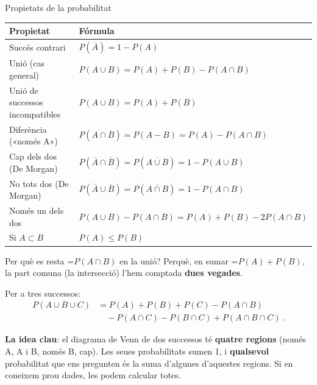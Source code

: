 \documentclass[11pt,a4paper]{article}
\newcommand{\fmm}[1]{\setbox0=\hbox{$#1$}\ifdim\wd0>\linewidth\[#1\]\else\mbox{\box0}\fi}
\newcommand{\fmuline}[1]{\textbf{\color{fmaccent}#1}}
\begin{document}
  
\begin{fmprop}{Propietats de la probabilitat}
\begin{center}\renewcommand{\arraystretch}{1.7}\small\begin{tabularx}{\linewidth}{>{\raggedright\arraybackslash}p{5.2cm}>{\centering\arraybackslash}X}\toprule
\textbf{Propietat} & \textbf{Fórmula}\\\midrule
Succés contrari & $P(\overline{A})=1-P(A)$\\[3pt]
Unió (cas general) & $P(A\cup B)=P(A)+P(B)-P(A\cap B)$\\[3pt]
Unió de successos incompatibles & $P(A\cup B)=P(A)+P(B)$\\[3pt]
Diferència («només A») & $P(A\cap\overline{B})=P(A-B)=P(A)-P(A\cap B)$\\[3pt]
Cap dels dos (De Morgan) & $P(\overline{A}\cap\overline{B})=P(\overline{A\cup B})=1-P(A\cup B)$\\[3pt]
No tots dos (De Morgan) & $P(\overline{A}\cup\overline{B})=P(\overline{A\cap B})=1-P(A\cap B)$\\[3pt]
Només un dels dos & $P(A\cup B)-P(A\cap B)=P(A)+P(B)-2P(A\cap B)$\\[3pt]
Si $A\subset B$ & $P(A)\leq P(B)$\\[3pt]
\bottomrule\end{tabularx}\end{center}

      

Per què es resta \fmm{P(A\cap B)} en la unió? Perquè, en sumar \fmm{P(A)+P(B)}, la part comuna (la intersecció) l'hem comptada \textbf{dues vegades}.

      

Per a tres successos: 
\[\begin{aligned}P(A\cup B\cup C)&=P(A)+P(B)+P(C)-P(A\cap B)\\&\quad-P(A\cap C)-P(B\cap C)+P(A\cap B\cap C)\,.\end{aligned}\]


      
\begin{fmnote}\fmuline{La idea clau}: el diagrama de Venn de dos successos té \textbf{quatre regions} (només A, A i B, només B, cap). Les seues probabilitats sumen 1, i \textbf{qualsevol} probabilitat que ens pregunten és la suma d'algunes d'aquestes regions. Si en coneixem prou dades, les podem calcular totes.\end{fmnote}
\end{fmprop}
\end{document}
